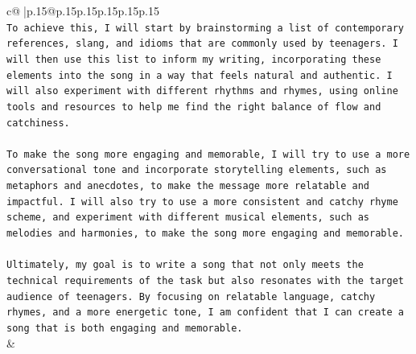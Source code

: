 \documentclass{article}
\begin{document}
{\begin{supertabular}{c@{$\;$}|p{.15\linewidth}@{}p{.15\linewidth}p{.15\linewidth}p{.15\linewidth}p{.15\linewidth}p{.15\linewidth}}
{{{\\ 
\texttt{To achieve this, I will start by brainstorming a list of contemporary references, slang, and idioms that are commonly used by teenagers. I will then use this list to inform my writing, incorporating these elements into the song in a way that feels natural and authentic. I will also experiment with different rhythms and rhymes, using online tools and resources to help me find the right balance of flow and catchiness.} \\
\\ 
\texttt{To make the song more engaging and memorable, I will try to use a more conversational tone and incorporate storytelling elements, such as metaphors and anecdotes, to make the message more relatable and impactful. I will also try to use a more consistent and catchy rhyme scheme, and experiment with different musical elements, such as melodies and harmonies, to make the song more engaging and memorable.} \\
\\ 
\texttt{Ultimately, my goal is to write a song that not only meets the technical requirements of the task but also resonates with the target audience of teenagers. By focusing on relatable language, catchy rhymes, and a more energetic tone, I am confident that I can create a song that is both engaging and memorable.} \\
            }
        }
    }
    & \\ \\

\end{supertabular}
}
\end{document}
